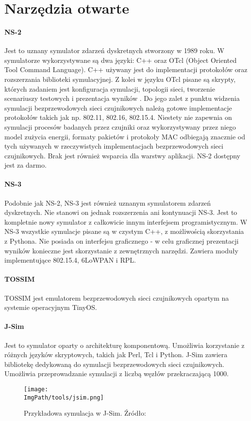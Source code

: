 \section{Narzędzia otwarte}
\paragraph{NS-2} Jest to uznany symulator zdarzeń dyskretnych stworzony w 1989 roku. W symulatorze wykorzystywane są dwa języki: C++ oraz OTcl (Object Oriented Tool Command Language). C++ używany jest do implementacji protokołów oraz rozszerzania biblioteki symulacyjnej. Z kolei w języku OTcl pisane są skrypty, których zadaniem jest konfiguracja symulacji, topologii sieci, tworzenie scenariuszy testowych i prezentacja wyników \cite{Heidemann2018, Meeneghan2004}. Do jego zalet z punktu widzenia symulacji bezprzewodowych sieci czujnikowych należą gotowe implementacje protokołów takich jak np. 802.11, 802.16, 802.15.4. Niestety nie zapewnia on symulacji  procesów badanych przez czujniki oraz wykorzystywany przez niego model zużycia energii, formaty pakietów i protokoły MAC odbiegają znacznie od tych używanych w rzeczywistych implementacjach bezprzewodowych sieci czujnikowych. Brak jest również wsparcia dla warstwy aplikacji. NS-2 dostępny jest za darmo.
\paragraph{NS-3 \cite{Nsnam}}
Podobnie jak NS-2, NS-3 jest również uznanym symulatorem zdarzeń dyskretnych. Nie stanowi on jednak rozszerzenia ani kontynuacji NS-3. Jest to kompletnie nowy symulator z całkowicie innym interfejsem programistycznym. W NS-3 wszystkie symulacje pisane są w czystym C++, z możliwością skorzystania z Pythona. Nie posiada on interfejsu graficznego - w celu graficznej prezentacji wyników konieczne jest skorzystanie z zewnętrznych narzędzi. Zawiera moduły implementujące 802.15.4, 6LoWPAN i RPL.
\paragraph{TOSSIM \cite{Musznicki2012}}
TOSSIM jest emulatorem bezprzewodowych sieci czujnikowych opartym na systemie operacyjnym TinyOS. 
\paragraph{J-Sim \cite{Sobeih2006}}
Jest to symulator oparty o architekturę komponentową. Umożliwia korzystanie z różnych języków skryptowych, takich jak Perl, Tcl i Python. J-Sim zawiera bibliotekę dedykowaną do symulacji bezprzewodowych sieci czujnikowych. Umożliwia przeprowadzanie symulacji z liczbą węzłów przekraczającą 1000.
\begin{figure}[H]
	\begin{center}
		\centering
		\texttt{[image: \\ImgPath/tools/jsim.png]} 
	\end{center}
	\caption{Przykładowa symulacja w J-Sim. Źródło: \cite{KarkazisP.2012RmiJ}}
	\label{jsim}
\end{figure}
